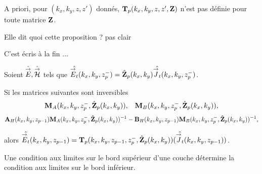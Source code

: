     A priori, pour \((k_x,k_y,z,z')\) donnés, \(\mathbf{T}_p(k_x,k_y,z,z',\mathbf{Z})\) n'est pas définie pour toute matrice \(\mathbf{Z}\).

\begin{REM}
  Elle dit quoi cette proposition ? pas clair
\end{REM}
\begin{REP}
  C'est écris à la fin ...
\end{REP}
    \begin{prop}%
      \label{prop:plan:transfert:impedance}

      Soient \(\hat{{\overset{\rightarrow}{E}}},\hat{{\overset{\rightarrow}{\mathcal{H}}}}\) tels que \(\hat{{\overset{\rightarrow}{E}}_t}(k_x,k_y,z_p^-) = \hat{\mathbf{Z}}_{p}(k_x,k_y)\hat{{\overset{\rightarrow}{J}}_t}(k_x,k_y,z_p^-)\).

      Si les matrices suivantes sont inversibles
      \begin{align*}
        \mathbf{M}_{A}(k_x,k_y,z_p^-, \hat{\mathbf{Z}}_{p}(k_x,k_y)), && \mathbf{M}_{B}(k_x,k_y,z_p^-, \hat{\mathbf{Z}}_{p}(k_x,k_y)),
      \end{align*}
      \begin{align*}
        \mathbf{A}_{H}(k_x,k_y,z_{p-1})\mathbf{M}_{A}(k_x,k_y,z_p^-, \hat{\mathbf{Z}}_{p}(k_x,k_y))^{-1} - \mathbf{B}_{H}(k_x,k_y,z_{p-1})\mathbf{M}_{B}(k_x,k_y,z_p^-, \hat{\mathbf{Z}}_{p}(k_x,k_y))^{-1},
      \end{align*}

      alors \(\hat{{\overset{\rightarrow}{E}}_t}(k_x,k_y,z_{p-1}) = \mathbf{T}_p(k_x,k_y,z_{p-1},z_p^-,\hat{\mathbf{Z}}_{p}(k_x,k_y))(\hat{{\overset{\rightarrow}{J}}_t}(k_x,k_y,z_{p-1}))\).

      Une condition aux limites sur le bord supérieur d'une couche détermine la condition aux limites sur le bord inférieur.
    \end{prop}


